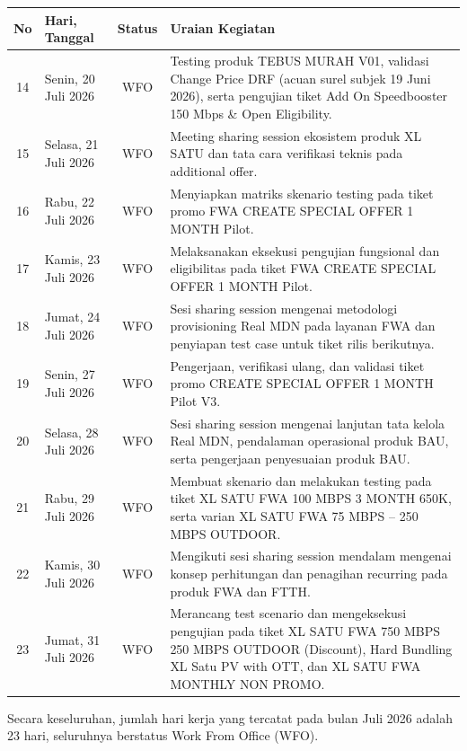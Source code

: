 \documentclass[12pt,a4paper]{article}
\begin{document}
\begin{singlespace}
\noindent
\begin{tabular}{|c|p{2.6cm}|c|p{9.8cm}|}
\hline
\textbf{No} & \textbf{Hari, Tanggal} & \textbf{Status} & \textbf{Uraian Kegiatan} \\
\hline
14 & Senin, 20 Juli 2026 & WFO & Testing produk TEBUS MURAH V01, validasi Change Price DRF (acuan surel subjek 19 Juni 2026), serta pengujian tiket Add On Speedbooster 150 Mbps \& Open Eligibility. \\
\hline
15 & Selasa, 21 Juli 2026 & WFO & Meeting sharing session ekosistem produk XL SATU dan tata cara verifikasi teknis pada additional offer. \\
\hline
16 & Rabu, 22 Juli 2026 & WFO & Menyiapkan matriks skenario testing pada tiket promo FWA CREATE SPECIAL OFFER 1 MONTH Pilot. \\
\hline
17 & Kamis, 23 Juli 2026 & WFO & Melaksanakan eksekusi pengujian fungsional dan eligibilitas pada tiket FWA CREATE SPECIAL OFFER 1 MONTH Pilot. \\
\hline
18 & Jumat, 24 Juli 2026 & WFO & Sesi sharing session mengenai metodologi provisioning Real MDN pada layanan FWA dan penyiapan test case untuk tiket rilis berikutnya. \\
\hline
19 & Senin, 27 Juli 2026 & WFO & Pengerjaan, verifikasi ulang, dan validasi tiket promo CREATE SPECIAL OFFER 1 MONTH Pilot V3. \\
\hline
20 & Selasa, 28 Juli 2026 & WFO & Sesi sharing session mengenai lanjutan tata kelola Real MDN, pendalaman operasional produk BAU, serta pengerjaan penyesuaian produk BAU. \\
\hline
21 & Rabu, 29 Juli 2026 & WFO & Membuat skenario dan melakukan testing pada tiket XL SATU FWA 100 MBPS 3 MONTH 650K, serta varian XL SATU FWA 75 MBPS -- 250 MBPS OUTDOOR. \\
\hline
22 & Kamis, 30 Juli 2026 & WFO & Mengikuti sesi sharing session mendalam mengenai konsep perhitungan dan penagihan recurring pada produk FWA dan FTTH. \\
\hline
23 & Jumat, 31 Juli 2026 & WFO & Merancang test scenario dan mengeksekusi pengujian pada tiket XL SATU FWA 750 MBPS 250 MBPS OUTDOOR (Discount), Hard Bundling XL Satu PV with OTT, dan XL SATU FWA MONTHLY NON PROMO. \\
\hline
\end{tabular}
\end{singlespace}

\vspace{0.2cm}
\noindent Secara keseluruhan, jumlah hari kerja yang tercatat pada bulan Juli 2026 adalah 23 hari, seluruhnya berstatus Work From Office (WFO).
\end{document}
